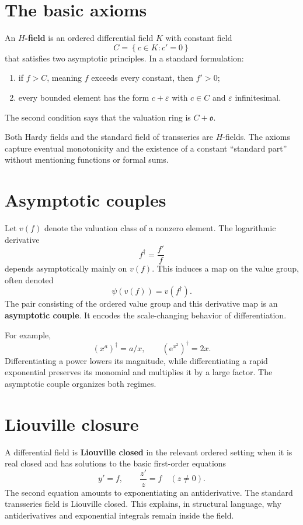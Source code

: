 \documentclass[11pt,openany]{book}
\theoremstyle{plain}
\theoremstyle{definition}
\theoremstyle{remark}
\newcommand{\e}{\mathrm{e}}
\newcommand{\set}[1]{\left\{#1\right\}}
\newcommand{\defterm}[1]{\textbf{#1}}
\begin{document}
\section{The basic axioms}
An \defterm{$H$-field} is an ordered differential field $K$ with constant field
\[
  C=\set{c\in K:c'=0}
\]
that satisfies two asymptotic principles. In a standard formulation:
\begin{enumerate}
\item if $f>C$, meaning $f$ exceeds every constant, then $f'>0$;
\item every bounded element has the form $c+\varepsilon$ with $c\in C$ and $\varepsilon$ infinitesimal.
\end{enumerate}
The second condition says that the valuation ring is $C+\mathfrak o$.

Both Hardy fields and the standard field of transseries are $H$-fields. The axioms capture eventual monotonicity and the existence of a constant ``standard part'' without mentioning functions or formal sums.

\section{Asymptotic couples}
Let $v(f)$ denote the valuation class of a nonzero element. The logarithmic derivative
\[
  f^\dagger=\frac{f'}f
\]
depends asymptotically mainly on $v(f)$. This induces a map on the value group, often denoted
\[
  \psi(v(f))=v(f^\dagger).
\]
The pair consisting of the ordered value group and this derivative map is an \defterm{asymptotic couple}. It encodes the scale-changing behavior of differentiation.

For example,
\[
  (x^a)^\dagger=a/x,
  \qquad
  (\e^{x^2})^\dagger=2x.
\]
Differentiating a power lowers its magnitude, while differentiating a rapid exponential preserves its monomial and multiplies it by a large factor. The asymptotic couple organizes both regimes.

\section{Liouville closure}
A differential field is \defterm{Liouville closed} in the relevant ordered setting when it is real closed and has solutions to the basic first-order equations
\[
  y'=f,
  \qquad
  \frac{z'}z=f\quad(z\ne0).
\]
The second equation amounts to exponentiating an antiderivative. The standard transseries field is Liouville closed. This explains, in structural language, why antiderivatives and exponential integrals remain inside the field.
\end{document}
